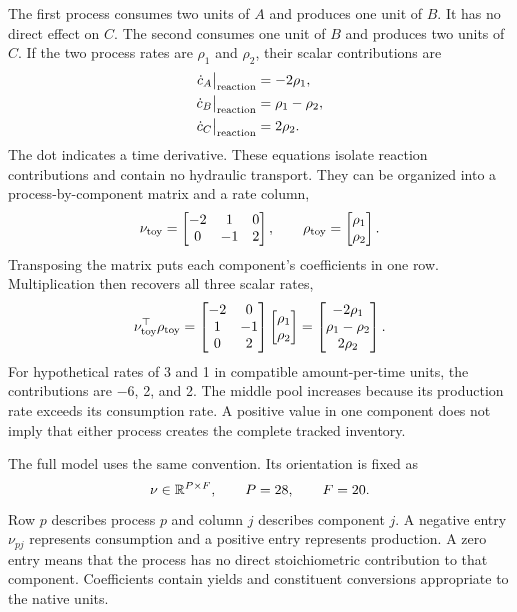 The first process consumes two units of $A$ and produces one unit of $B$. It has no direct effect on $C$. The second consumes one unit of $B$ and produces two units of $C$. If the two process rates are $\rho_1$ and $\rho_2$, their scalar contributions are
\[
\begin{aligned}
\dot c_A\big|_{\rm reaction}&=-2\rho_1,\\
\dot c_B\big|_{\rm reaction}&=\rho_1-\rho_2,\\
\dot c_C\big|_{\rm reaction}&=2\rho_2.
\end{aligned}
\]
The dot indicates a time derivative. These equations isolate reaction contributions and contain no hydraulic transport. They can be organized into a process-by-component matrix and a rate column,
\[
\nu_{\rm toy}=\begin{bmatrix}-2&1&0\\0&-1&2\end{bmatrix},\qquad
\rho_{\rm toy}=\begin{bmatrix}\rho_1\\\rho_2\end{bmatrix}.
\]
Transposing the matrix puts each component's coefficients in one row. Multiplication then recovers all three scalar rates,
\[
\nu_{\rm toy}^\top\rho_{\rm toy}
=\begin{bmatrix}-2&0\\1&-1\\0&2\end{bmatrix}
\begin{bmatrix}\rho_1\\\rho_2\end{bmatrix}
=\begin{bmatrix}-2\rho_1\\\rho_1-\rho_2\\2\rho_2\end{bmatrix}.
\]
For hypothetical rates of 3 and 1 in compatible amount-per-time units, the contributions are $-6$, 2, and 2. The middle pool increases because its production rate exceeds its consumption rate. A positive value in one component does not imply that either process creates the complete tracked inventory.

The full model uses the same convention. Its orientation is fixed as
\begin{equation}
\equationname{Dimensions and orientation of the stoichiometric matrix}
\nu\in\mathbb{R}^{P\times F},\qquad P=28,\qquad F=20.
\label{eq:petersen_orientation}
\end{equation}
Row $p$ describes process $p$ and column $j$ describes component $j$. A negative entry $\nu_{pj}$ represents consumption and a positive entry represents production. A zero entry means that the process has no direct stoichiometric contribution to that component. Coefficients contain yields and constituent conversions appropriate to the native units.

